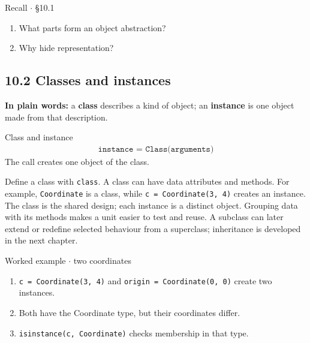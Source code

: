 \documentclass[11pt]{article}
\begin{document}
\begin{keepsection}
\begin{recallbox}{Recall \ensuremath{\cdot} §10.1}
\begin{enumerate}
\item What parts form an object abstraction?
\item Why hide representation?
\end{enumerate}

\end{recallbox}
\end{keepsection}

\begin{keepsection}
\section{10.2 Classes and instances}

\begin{plainbox}\textbf{In plain words:} a \textbf{class} describes a kind of object; an \textbf{instance} is one object made from that description.\end{plainbox}

\begin{equationcard}{Class and instance}
\[ \begin{gathered} \texttt{instance = Class(arguments)} \end{gathered} \]
{\small The call creates one object of the class.}
\end{equationcard}

Define a class with \texttt{class}. A class can have data attributes and methods. For example, \texttt{Coordinate} is a class, while \texttt{c = Coordinate(3, 4)} creates an instance. The class is the shared design; each instance is a distinct object. Grouping data with its methods makes a unit easier to test and reuse. A subclass can later extend or redefine selected behaviour from a superclass; inheritance is developed in the next chapter.

\begin{workedbox}{Worked example \ensuremath{\cdot} two coordinates}
\begin{enumerate}
\item \texttt{c = Coordinate(3, 4)} and \texttt{origin = Coordinate(0, 0)} create two instances.
\item Both have the Coordinate type, but their coordinates differ.
\item \texttt{isinstance(c, Coordinate)} checks membership in that type.
\end{enumerate}
\end{workedbox}


\end{keepsection}
\end{document}
